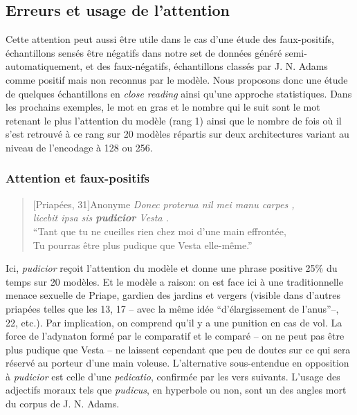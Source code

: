 \subsection{Erreurs et usage de l'attention}

Cette attention peut aussi être utile dans le cas d'une étude des faux-positifs, échantillons sensés être négatifs dans notre set de données généré semi-automatiquement, et des faux-négatifs, échantillons classés par J. N. Adams comme positif mais non reconnus par le modèle. Nous proposons donc une étude de quelques échantillons en \textit{close reading} ainsi qu'une approche statistiques. Dans les prochains exemples, le mot en gras et le nombre qui le suit sont le mot retenant le plus l'attention du modèle (rang 1) ainsi que le nombre de fois où il s'est retrouvé à ce rang sur 20 modèles répartis sur deux architectures variant au niveau de l'encodage à 128 ou 256.

\subsubsection{Attention et faux-positifs}

\begin{quote}[Priapées, 31]{Anonyme}
    \textit{Donec proterua nil mei manu carpes ,{\\}  licebit ipsa sis \textbf{pudicior} Vesta . } \\
    \enquote{Tant que tu ne cueilles rien chez moi d’une main effrontée, {\\} Tu pourras être plus pudique que Vesta elle-même.}
\end{quote}

Ici, \textit{pudicior} reçoit l'attention du modèle et donne une phrase positive 25\% du temps sur 20 modèles. Et le modèle a raison: on est face ici à une traditionnelle menace sexuelle de Priape, gardien des jardins et vergers (visible dans d'autres priapées telles que les 13, 17 -- avec la même idée ``d'élargissement de l'anus''--, 22, etc.). Par implication, on comprend qu'il y a une punition en cas de vol. La force de l'adynaton formé par le comparatif et le comparé -- on ne peut pas être plus pudique que Vesta -- ne laissent cependant que peu de doutes sur ce qui sera réservé au porteur d'une main voleuse. L'alternative sous-entendue en opposition à \textit{pudicior} est celle d'une \textit{pedicatio}, confirmée par les vers suivants. L'usage des adjectifs moraux tels que \textit{pudicus}, en hyperbole ou non, sont un des angles mort du corpus de J. N. Adams.


